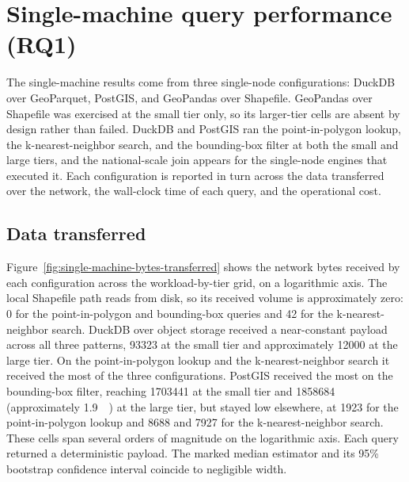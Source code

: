 \section{Single-machine query performance (RQ1)}
\label{results:single-machine-query-performance}

The single-machine results come from three single-node configurations: DuckDB over GeoParquet, PostGIS, and GeoPandas over Shapefile. GeoPandas over Shapefile was exercised at the small tier only, so its larger-tier cells are absent by design rather than failed. DuckDB and PostGIS ran the point-in-polygon lookup, the k-nearest-neighbor search, and the bounding-box filter at both the small and large tiers, and the national-scale join appears for the single-node engines that executed it. Each configuration is reported in turn across the data transferred over the network, the wall-clock time of each query, and the operational cost.

\subsection{Data transferred}
\label{results:single-machine-query-performance:data-transferred}

Figure~\ref{fig:single-machine-bytes-transferred} shows the network bytes received by each configuration across the workload-by-tier grid, on a logarithmic axis. The local Shapefile path reads from disk, so its received volume is approximately zero: \SI{0}{\byte} for the point-in-polygon and bounding-box queries and \SI{42}{\byte} for the k-nearest-neighbor search. DuckDB over object storage received a near-constant payload across all three patterns, \SI{93323}{\byte} at the small tier and approximately \SI{12000}{\byte} at the large tier. On the point-in-polygon lookup and the k-nearest-neighbor search it received the most of the three configurations. PostGIS received the most on the bounding-box filter, reaching \SI{1703441}{\byte} at the small tier and \SI{1858684}{\byte} (approximately \SI{1.9}{\mega\byte}) at the large tier, but stayed low elsewhere, at \SI{1923}{\byte} for the point-in-polygon lookup and \SI{8688}{\byte} and \SI{7927}{\byte} for the k-nearest-neighbor search. These cells span several orders of magnitude on the logarithmic axis. Each query returned a deterministic payload. The marked median estimator and its \num{95}\% bootstrap confidence interval coincide to negligible width.

